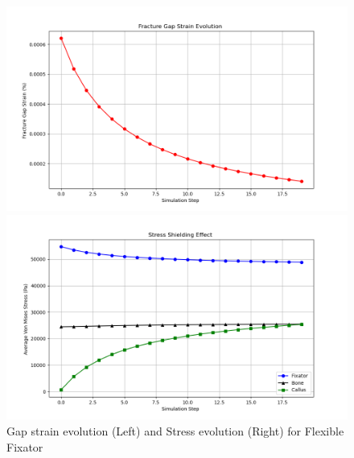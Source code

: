 \documentclass{article}
\begin{document}
\begin{figure}[htbp]
  \centering
  \begin{minipage}{0.45\textwidth}
    \centering
    \includegraphics[width=\textwidth]{../output_advanced/Flexible/gap_strain.png}
  \end{minipage}
  \hfill
  \begin{minipage}{0.45\textwidth}
    \centering
    \includegraphics[width=\textwidth]{../output_advanced/Flexible/stress_shielding.png}
  \end{minipage}
  \caption{Gap strain evolution (Left) and Stress evolution (Right) for Flexible Fixator}
  \label{fig:flexible_gap_strain_stress_shielding}
\end{figure}
\end{document}
